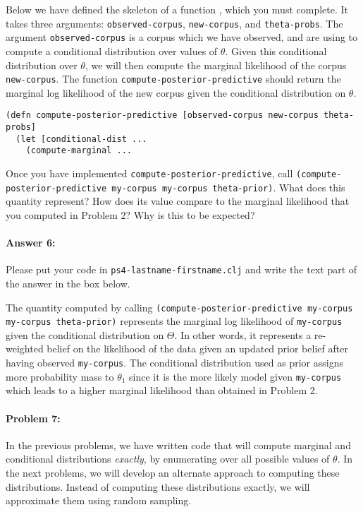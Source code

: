 \documentclass[10pt]{article}
\newcommand{\required}[1]{{\color{blue}{#1}}}
\newcommand{\PSnum}{4}
\begin{document}
\noindent Below we have defined the skeleton of a function
\required{\texttt{compute-posterior-predictive}}, which you must
complete. It takes three arguments: \texttt{observed-corpus},
\texttt{new-corpus}, and \texttt{theta-probs}. The argument
\texttt{observed-corpus} is a corpus which we have observed, and are
using to compute a conditional distribution over values of $\theta$.
Given this conditional distribution over $\theta$, we will then
compute the marginal likelihood of the corpus \texttt{new-corpus}. The
function \texttt{compute-posterior-predictive} should return the
marginal log likelihood of the new corpus given the conditional
distribution on $\theta$.

\begin{lstlisting}
(defn compute-posterior-predictive [observed-corpus new-corpus theta-probs]
  (let [conditional-dist ...
    (compute-marginal ...
\end{lstlisting}

\noindent Once you have implemented
\texttt{compute-posterior-predictive}, call
\texttt{(compute-posterior-predictive my-corpus my-corpus
theta-prior)}. What does this quantity represent? How does its value
compare to the marginal likelihood that you computed in Problem 2? Why
is this to be expected?

\paragraph{Answer 6:} Please put your code in
\texttt{ps\PSnum-lastname-firstname.clj} and write the text part of
the answer in the box below.

\begin{mdframed}
The quantity computed by calling \texttt{(compute-posterior-predictive my-corpus my-corpus theta-prior)} represents the marginal log likelihood of \texttt{my-corpus} given the conditional distribution on $\Theta$. In other words, it represents a re-weighted belief on the likelihood of the data given an updated prior belief after having observed \texttt{my-corpus}. The conditional distribution used as prior assigns more probability mass to $\theta_1$ since it is the more likely model given \texttt{my-corpus} which leads to a higher marginal likelihood than obtained in Problem 2.
\end{mdframed}

\noindent\hrulefill %

\paragraph{Problem 7:}
In the previous problems, we have written code that will compute
marginal and conditional distributions \emph{exactly}, by enumerating
over all possible values of $\theta$. In the next problems, we will
develop an alternate approach to computing these distributions.
Instead of computing these distributions exactly, we will approximate
them using random sampling.  \\
\end{document}

